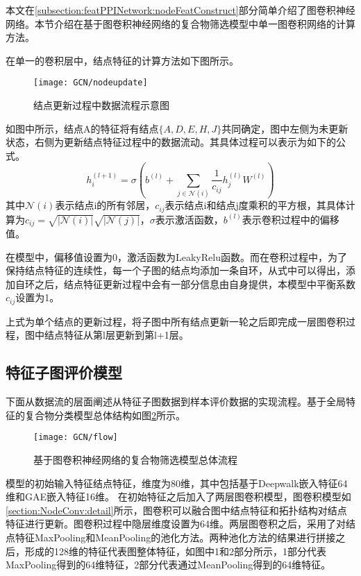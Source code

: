 本文在\ref{subsection:featPPINetwork:nodeFeatConstruct}部分简单介绍了图卷积神经网络。本节介绍在基于图卷积神经网络的复合物筛选模型中单一图卷积网络的计算方法。

在单一的卷积层中，结点特征的计算方法如下图所示。

\begin{figure}[htbp]
    \centering
    \texttt{[image: GCN/nodeupdate]}
    \caption{结点更新过程中数据流程示意图}
    \label{fig:GCN/nodeupdate}
\end{figure}
如图中所示，结点A的特征将有结点$\{A,D,E,H,J\}$共同确定，图中左侧为未更新状态，右侧为更新结点特征过程中的数据流动。其具体过程可以表示为如下的公式。
\begin{equation}
    \label{equ:normalgcn}
    h_i^{(l+1)} = \sigma(b^{(l)} + \sum_{j\in\mathcal{N}(i)}\frac{1}{c_{ij}}h_j^{(l)}W^{(l)})
\end{equation}
其中$\mathcal{N}(i)$表示结点i的所有邻居，${c_{ij}}$表示结点i和结点j度乘积的平方根，其具体计算为$c_{ij} = \sqrt{|\mathcal{N}(i)|}\sqrt{|\mathcal{N}(j)|}$，$\sigma$表示激活函数，$b^{(l)}$表示卷积过程中的偏移值。

在模型中，偏移值设置为0，激活函数为LeakyRelu函数。而在卷积过程中，为了保持结点特征的连续性，每一个子图的结点均添加一条自环，从式中可以得出，添加自环之后，结点特征更新过程中会有一部分信息由自身提供，本模型中平衡系数${c_{ij}}$设置为1。

上式为单个结点的更新过程，将子图中所有结点更新一轮之后即完成一层图卷积过程，图中结点特征从第l层更新到第l+1层。

\subsection{特征子图评价模型}
\label{subsection:NodeConv:flow}

下面从数据流的层面阐述从特征子图数据到样本评价数据的实现流程。基于全局特征的复合物分类模型总体结构如图\ref{fig:GCN/flow}所示。
\begin{figure}[htbp]
    \centering
    \texttt{[image: GCN/flow]}
    \caption{基于图卷积神经网络的复合物筛选模型总体流程}
    \label{fig:GCN/flow}
\end{figure}
模型的初始输入特征结点特征，维度为80维，其中包括基于Deepwalk嵌入特征64维和GAE嵌入特征16维。
在初始特征之后加入了两层图卷积模型，图卷积模型如\ref{section:NodeConv:detail}所示，图卷积可以融合图中结点特征和拓扑结构对结点特征进行更新。图卷积过程中隐层维度设置为64维。两层图卷积之后，采用了对结点特征MaxPooling和MeanPooling的池化方法。两种池化方法的结果进行拼接之后，形成的128维的特征代表图整体特征，如图中1和2部分所示，1部分代表MaxPooling得到的64维特征，2部分代表通过MeanPooling得到的64维特征。

